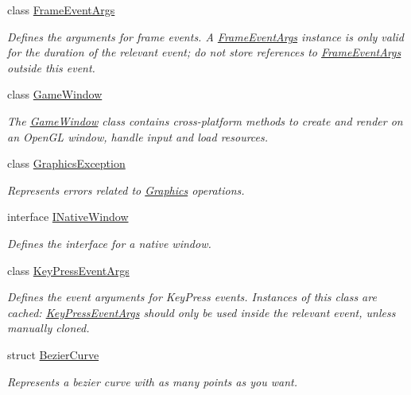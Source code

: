 \begin{DoxyCompactItemize}
class \hyperlink{class_open_t_k_1_1_frame_event_args}{Frame\-Event\-Args}
\begin{DoxyCompactList}\small\item\em Defines the arguments for frame events. A \hyperlink{class_open_t_k_1_1_frame_event_args}{Frame\-Event\-Args} instance is only valid for the duration of the relevant event; do not store references to \hyperlink{class_open_t_k_1_1_frame_event_args}{Frame\-Event\-Args} outside this event. \end{DoxyCompactList}\item 
class \hyperlink{class_open_t_k_1_1_game_window}{Game\-Window}
\begin{DoxyCompactList}\small\item\em The \hyperlink{class_open_t_k_1_1_game_window}{Game\-Window} class contains cross-\/platform methods to create and render on an Open\-G\-L window, handle input and load resources. \end{DoxyCompactList}\item 
class \hyperlink{class_open_t_k_1_1_graphics_exception}{Graphics\-Exception}
\begin{DoxyCompactList}\small\item\em Represents errors related to \hyperlink{namespace_open_t_k_1_1_graphics}{Graphics} operations.\end{DoxyCompactList}\item 
interface \hyperlink{interface_open_t_k_1_1_i_native_window}{I\-Native\-Window}
\begin{DoxyCompactList}\small\item\em Defines the interface for a native window. \end{DoxyCompactList}\item 
class \hyperlink{class_open_t_k_1_1_key_press_event_args}{Key\-Press\-Event\-Args}
\begin{DoxyCompactList}\small\item\em Defines the event arguments for Key\-Press events. Instances of this class are cached\-: \hyperlink{class_open_t_k_1_1_key_press_event_args}{Key\-Press\-Event\-Args} should only be used inside the relevant event, unless manually cloned. \end{DoxyCompactList}\item 
struct \hyperlink{struct_open_t_k_1_1_bezier_curve}{Bezier\-Curve}
\begin{DoxyCompactList}\small\item\em Represents a bezier curve with as many points as you want. \end{DoxyCompactList}\item 

\end{DoxyCompactItemize}
